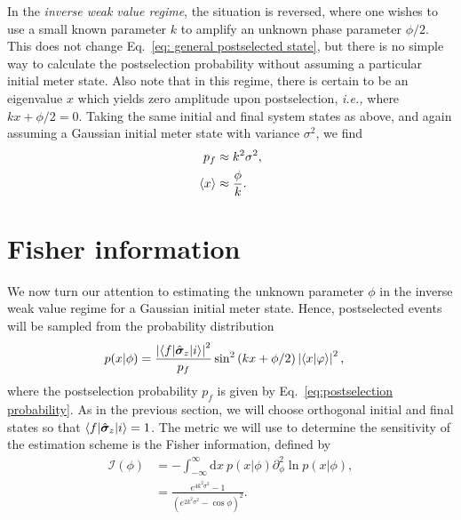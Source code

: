 In the \emph{inverse weak value regime}, the situation is reversed, where one wishes to use a small known parameter $k$ to amplify an unknown phase parameter $\phi/{2}$.  This does not change Eq.~\eqref{eq: general postselected state}, but there is no simple way to calculate the postselection probability without assuming a particular initial meter state.  Also note that in this regime, there is certain to be an eigenvalue $x$ which yields zero amplitude upon postselection, \emph{i.e.,} where $k x + \phi/{2} = 0$.  Taking the same initial and final system states as above, and again assuming a Gaussian initial meter state with variance $\sigma^2$, we find 
\begin{align}\label{eq:noiseless iwv}
	\nonumber p_f &\approx k^2 \sigma^2, \\
	\left\langle x \right\rangle &\approx \frac{\phi}{k}.
\end{align}

\section{Fisher information}\label{sec:noiseless}
We now turn our attention to estimating the unknown parameter $\phi$ in the inverse weak value regime for a Gaussian initial meter state.  Hence, postselected events will be sampled from the probability distribution
\begin{align}\label{eq: general distribution}
	p(x|\phi) &= \frac{\left|\langle f \rvert\hat{\bm \sigma}_z \lvert i\rangle\right|^2}{p_f}\sin^2\left(kx + \phi/2\right)\left|\langle x \vert \varphi \rangle\right|^2,
\end{align}  
where the postselection probability $p_f$ is given by Eq.~\eqref{eq:postselection probability}.
As in the previous section, we will choose orthogonal initial and final states so that $\langle f \rvert\hat{\bm \sigma}_z\lvert i\rangle = 1$.
The metric we will use to determine the sensitivity of the estimation scheme is the Fisher information, defined by 
\begin{align}\label{eq:noiseless fisher}
	\nonumber \mathcal{I}(\phi) &= -\int_{-\infty}^{\infty} \text{d}x~ p(x|\phi)\partial_\phi^2 \ln p(x|\phi), \\
	&= \frac{e^{4k^2\sigma^2} - 1}{(e^{2k^2\sigma^2}-\cos \phi)^2}.
\end{align}

